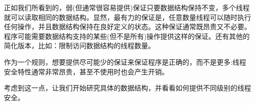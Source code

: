 正如我们所看到的，弱(但通常很容易提供)保证只要数据结构保持不变，多个线程就可以读取相同的数据结构。显然，最有力的保证是，任意数量线程可以随时执行任何操作，并且数据结构保持在良好定义的状态。这种保证通常既昂贵又不必要。程序可能需要数据结构支持的某些(但不是所有)操作提供这样的保证。还有其他的简化版本，比如：限制访问数据结构的线程数量。

作为一个规则，想要提供尽可能少的保证来保证程序是正确的，而不是更多:线程安全特性通常非常昂贵，甚至不使用时也会产生开销。

考虑到这一点，让我们开始研究具体的数据结构，并看看如何提供不同级别的线程安全。

































